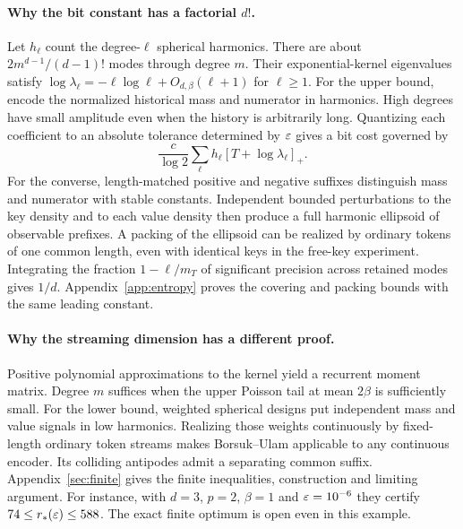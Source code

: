 \paragraph{Why the bit constant has a factorial $d!$.}
Let $h_\ell$ count the degree-$\ell$ spherical harmonics. There are about $2m^{d-1}/(d-1)!$ modes through degree $m$. Their exponential-kernel eigenvalues satisfy $\log\lambda_\ell=-\ell\log\ell+O_{d,\beta}(\ell+1)$ for $\ell\ge1$. For the upper bound, encode the normalized historical mass and numerator in harmonics. High degrees have small amplitude even when the history is arbitrarily long. Quantizing each coefficient to an absolute tolerance determined by $\varepsilon$ gives a bit cost governed by
\[
  \frac{c}{\log 2}\sum_{\ell} h_\ell[T+\log\lambda_\ell]_+ .
\]
For the converse, length-matched positive and negative suffixes distinguish mass and numerator with stable constants. Independent bounded perturbations to the key density and to each value density then produce a full harmonic ellipsoid of observable prefixes. A packing of the ellipsoid can be realized by ordinary tokens of one common length, even with identical keys in the free-key experiment. Integrating the fraction $1-\ell/m_T$ of significant precision across retained modes gives $1/d$. Appendix~\ref{app:entropy} proves the covering and packing bounds with the same leading constant.

\paragraph{Why the streaming dimension has a different proof.}
Positive polynomial approximations to the kernel yield a recurrent moment matrix. Degree $m$ suffices when the upper Poisson tail at mean $2\beta$ is sufficiently small. For the lower bound, weighted spherical designs put independent mass and value signals in low harmonics. Realizing those weights continuously by fixed-length ordinary token streams makes Borsuk--Ulam applicable to any continuous encoder. Its colliding antipodes admit a separating common suffix. Appendix~\ref{sec:finite} gives the finite inequalities, construction and limiting argument. For instance, with $d=3$, $p=2$, $\beta=1$ and $\varepsilon=10^{-6}$ they certify $74\le r_*(\varepsilon)\le588$. The exact finite optimum is open even in this example.

